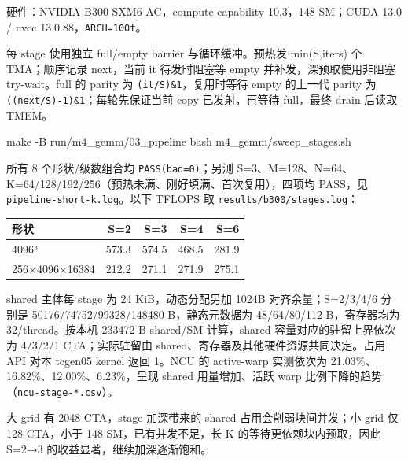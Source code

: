 \documentclass[11pt,a4paper,fontset=fandol]{ctexart}
\newenvironment{Shaded}{}{}
\newcommand{\AttributeTok}[1]{\textcolor[rgb]{0.49,0.56,0.16}{#1}}
\newcommand{\FunctionTok}[1]{\textcolor[rgb]{0.02,0.16,0.49}{#1}}
\newcommand{\NormalTok}[1]{#1}
\begin{document}
\begin{answer}

硬件：NVIDIA B300 SXM6 AC，compute capability 10.3，148 SM；CUDA 13.0 /
nvcc 13.0.88，\texttt{ARCH=\allowbreak{}100f}。

每 stage 使用独立 full/empty barrier 与循环缓冲。预热发 min(S,iters) 个
TMA；顺序记录 next，当前 it 待发时阻塞等 empty 并补发，深预取使用非阻塞
try-wait。full 的 parity 为 \texttt{(it/\allowbreak{}S)\&1}，复用时等待
empty 的上一代 parity 为
\texttt{((next/\allowbreak{}S)-\allowbreak{}1)\&1}；每轮先保证当前 copy
已发射，再等待 full，最终 drain 后读取 TMEM。

\begin{Shaded}
\begin{Highlighting}[]
\FunctionTok{make} \AttributeTok{{-}B}\NormalTok{ run/m4\_gemm/03\_pipeline}
\FunctionTok{bash}\NormalTok{ m4\_gemm/sweep\_stages.sh}
\end{Highlighting}
\end{Shaded}

所有 8 个形状/级数组合均 \texttt{PASS(bad=\allowbreak{}0)}；另测
S=3、M=128、N=64、K=64/128/192/256（预热未满、刚好填满、首次复用），四项均
PASS，见
\texttt{pipeline-\allowbreak{}short-\allowbreak{}k.\allowbreak{}log}。以下
TFLOPS 取
\texttt{results/\allowbreak{}b300/\allowbreak{}stages.\allowbreak{}log}：

\begin{longtable}[]{@{}lrrrr@{}}
\toprule\noalign{}
形状 & S=2 & S=3 & S=4 & S=6 \\
\midrule\noalign{}
\endhead
\bottomrule\noalign{}
\endlastfoot
4096³ & 573.3 & 574.5 & 468.5 & 281.9 \\
256×4096×16384 & 212.2 & 271.1 & 271.9 & 275.1 \\
\end{longtable}

shared 主体每 stage 为 24 KiB，动态分配另加 1024B 对齐余量；S=2/3/4/6
分别是 50176/74752/99328/148480 B，静态元数据为 48/64/80/112
B，寄存器均为 32/thread。按本机 233472 B shared/SM 计算，shared
容量对应的驻留上界依次为 4/3/2/1 CTA；实际驻留由
shared、寄存器及其他硬件资源共同决定。占用 API 对本 tcgen05 kernel 返回
1。NCU 的 active-warp 实测依次为 21.03\%、16.82\%、12.00\%、6.23\%，呈现
shared 用量增加、活跃 warp
比例下降的趋势（\texttt{ncu-\allowbreak{}stage-\allowbreak{}*.\allowbreak{}csv}）。

大 grid 有 2048 CTA，stage 加深带来的 shared 占用会削弱块间并发；小 grid
仅 128 CTA，小于 148 SM，已有并发不足，长 K 的等待更依赖块内预取，因此
S=2→3 的收益显著，继续加深逐渐饱和。


\end{answer}
\end{document}
